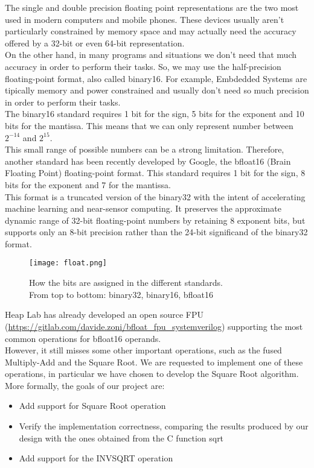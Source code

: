 The single and double precision floating point representations are the two most used in modern computers and mobile phones. These devices usually aren’t particularly constrained by memory space and may actually need the accuracy offered by a 32-bit or even 64-bit representation.\\
On the other hand, in many programs and situations we don’t need that much accuracy in order to perform their tasks. So, we may use the half-precision floating-point format, also called binary16. For example, Embdedded Systems are tipically memory and power constrained and usually don't need so much precision in order to perform their tasks. \\
The binary16 standard requires 1 bit for the sign, 5 bits for the exponent and 10 bits for the mantissa. This means that we can only represent number between $2^{-14}$ and $2^{15}$.\\
This small range of possible numbers can be a strong limitation. Therefore, another standard has been recently developed by Google, the bfloat16 (Brain Floating Point) floating-point format. This standard requires 1 bit for the sign, 8 bits for the exponent and 7 for the mantissa. \\
This format is a truncated version of the binary32 with the intent of accelerating machine learning and near-sensor computing. It preserves the approximate dynamic range of 32-bit floating-point numbers by retaining 8 exponent bits, but supports only an 8-bit precision rather than the 24-bit significand of the binary32 format. 

\begin{figure}[h]
	\centering
	\captionsetup{justification=centering}
	\texttt{[image: float.png]}	
	\caption{How the bits are assigned in the different standards. \\From top to bottom: binary32, binary16, bfloat16}
\end{figure}

Heap Lab has already developed an open source FPU (\url{https://gitlab.com/davide.zoni/bfloat_fpu_systemverilog}) supporting the most common operations for bfloat16 operands. \\
However, it still misses some other important operations, such as the fused Multiply-Add and the Square Root. We are requested to implement one of these operations, in particular we have chosen to develop the Square Root algorithm.\\

More formally, the goals of our project are:
\begin{itemize}
	\item Add support for Square Root operation
	\item Verify the implementation correctness, comparing the results produced by our design with the ones obtained from the C function sqrt
	\item Add support for the INVSQRT operation
\end{itemize}

\clearpage
